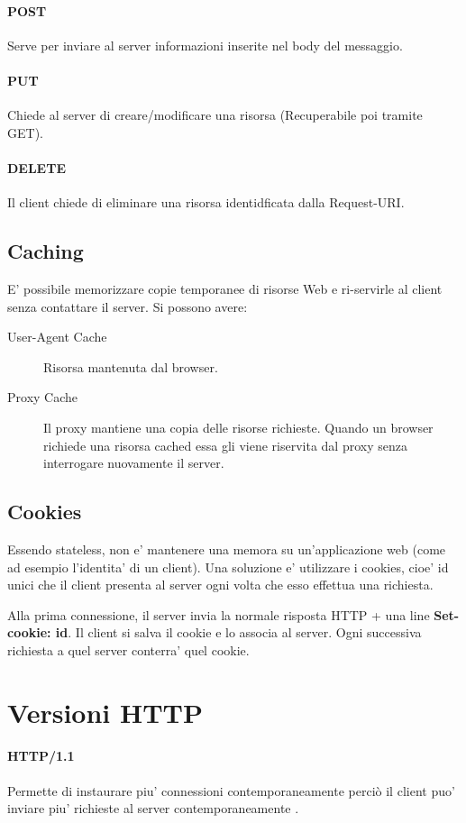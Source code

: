 \paragraph{POST} Serve per inviare al server informazioni inserite nel body del messaggio.
\paragraph{PUT} Chiede al server di creare/modificare una risorsa (Recuperabile poi tramite GET).
\paragraph{DELETE} Il client chiede di eliminare una risorsa identidficata dalla Request-URI.
\subsection{Caching}
E' possibile memorizzare copie temporanee di risorse Web e ri-servirle al client senza contattare il server.
Si possono avere:
\begin{description}
    \item[User-Agent Cache] Risorsa mantenuta dal browser.
    \item[Proxy Cache] Il proxy mantiene una copia delle risorse richieste. Quando un browser richiede una risorsa cached essa gli viene riservita dal proxy senza interrogare nuovamente il server.
\end{description}
\subsection{Cookies}
Essendo stateless, non e' mantenere una memora su un'applicazione web (come ad esempio l'identita' di un client).
Una soluzione e' utilizzare i cookies, cioe' id unici che il client presenta al server ogni volta che esso effettua una richiesta.

Alla prima connessione, il server invia la normale risposta HTTP + una line \textbf{Set-cookie: id}.
Il client si salva il cookie e lo associa al server. Ogni successiva richiesta a quel server conterra' quel cookie.

\section{Versioni HTTP}
\paragraph{HTTP/1.1}
Permette di instaurare piu' connessioni contemporaneamente perciò il client puo' inviare piu' richieste al server contemporaneamente .

